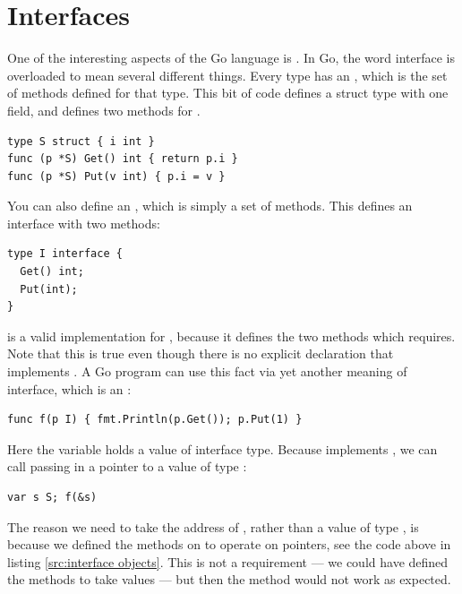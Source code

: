 \section{Interfaces}
One of the interesting aspects of the Go language is .
In Go, the word interface is overloaded to mean several different
things. Every type has an , which is the set of methods defined for
that type. This bit of code defines a struct type  with one field, and
defines two methods for .
\begin{lstlisting}[caption=Defining a struct and methods,label=src:interface object]
type S struct { i int }
func (p *S) Get() int { return p.i }
func (p *S) Put(v int) { p.i = v }
\end{lstlisting}
You can also define an , which is simply a set of methods.
This defines an interface  with two methods:
\begin{lstlisting}
type I interface {
  Get() int;
  Put(int);
}
\end{lstlisting}
 is a valid implementation for , because it defines the two 
methods which  requires. Note that this is true even though there is 
no explicit declaration that  implements . A Go program can use 
this fact via yet another meaning of interface, which is an :

\begin{lstlisting}
func f(p I) { fmt.Println(p.Get()); p.Put(1) }
\end{lstlisting}
Here the variable  holds a value of interface type. Because
implements , we can call  passing in a pointer to a value of type
:

\begin{lstlisting}
var s S; f(&s)
\end{lstlisting}
The reason we need to take the address of , rather than a value of type
, is because we defined the methods on  to operate on
pointers, see the code above in listing \ref{src:interface objects}.
This
is not a requirement --- we could have defined the methods to take
values --- but then the  method would not work as expected.

